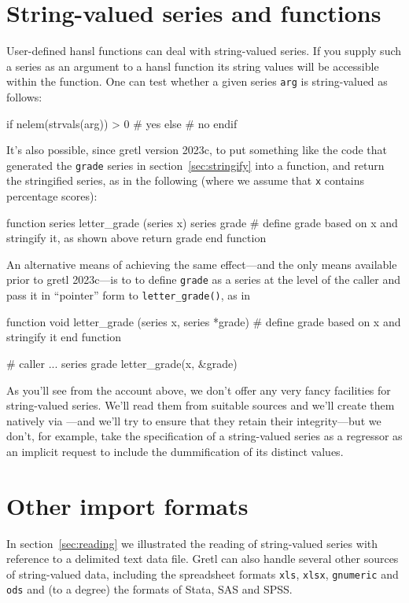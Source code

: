 \section{String-valued series and functions}

User-defined hansl functions can deal with string-valued series.  If
you supply such a series as an argument to a hansl function its string
values will be accessible within the function. One can test whether a
given series \texttt{arg} is string-valued as follows:
\begin{code}
if nelem(strvals(arg)) > 0
  # yes
else
  # no
endif
\end{code}

It's also possible, since gretl version 2023c, to put something like
the code that generated the \texttt{grade} series in
section~\ref{sec:stringify} into a function, and return the
stringified series, as in the following (where we assume that
\texttt{x} contains percentage scores):
\begin{code}
function series letter_grade (series x)
  series grade
  # define grade based on x and stringify it, as shown above
  return grade
end function
\end{code}
%
An alternative means of achieving the same effect---and the only means
available prior to gretl 2023c---is to to define \texttt{grade} as a
series at the level of the caller and pass it in ``pointer'' form to
\verb|letter_grade()|, as in
%
\begin{code}
function void letter_grade (series x, series *grade)
  # define grade based on x and stringify it
end function

# caller
...
series grade
letter_grade(x, &grade)
\end{code}

As you'll see from the account above, we don't offer any very fancy
facilities for string-valued series. We'll read them from suitable
sources and we'll create them natively via ---and
we'll try to ensure that they retain their integrity---but we don't,
for example, take the specification of a string-valued series as a
regressor as an implicit request to include the dummification of its
distinct values.

\section{Other import formats}
\label{sec:other-imports}

In section~\ref{sec:reading} we illustrated the reading of
string-valued series with reference to a delimited text data
file. Gretl can also handle several other sources of string-valued
data, including the spreadsheet formats \texttt{xls}, \texttt{xlsx},
\texttt{gnumeric} and \texttt{ods} and (to a degree) the formats of
\textsf{Stata}, \textsf{SAS} and \textsf{SPSS}.

